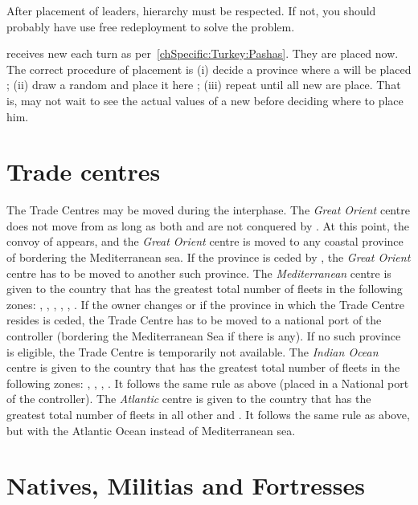 \aparag[Hierarchy]
After placement of leaders, hierarchy must be respected.
\bparag If not, you should probably have use free redeployment to solve the
problem.

\aparag[\Pashas]
\TUR receives new \Pashas each turn as
per~\ref{chSpecific:Turkey:Pashas}. They are placed now.
\bparag The correct procedure of placement is (i) decide a province where a
\Pasha will be placed ; (ii) draw a random \Pasha and place it here ; (iii)
repeat until all new \Pashas are place.
\bparag That is, \TUR may not wait to see the actual values of a new \Pasha
before deciding where to place him.

\section{Trade centres}\label{chInter:Trade Centres}

\aparag The Trade Centres may be moved during the interphase.
\aparag The \emph{Great Orient} centre does not move from 
as long as both  and  are not conquered by \TUR.
\bparag At this point, the convoy of  appears, and the
\emph{Great Orient} centre is moved to any coastal province of
 bordering the Mediterranean sea.
\bparag If the province is ceded by \TUR, the \emph{Great Orient} centre has
to be moved to another such province.
\aparag The \emph{Mediterranean} centre is given to the country that has the
greatest total number of fleets in the following zones: ,
, , , , .
\bparag If the owner changes or if the province in which the Trade Centre
resides is ceded, the Trade Centre has to be moved to a national port of the
controller (bordering the Mediterranean Sea if there is any).
\bparag If no such province is eligible, the Trade Centre is temporarily not
available.
\aparag The \emph{Indian Ocean} centre is given to the country that has the
greatest total number of fleets in the following zones: ,
, , .
\bparag It follows the same rule as above (placed in a National port of the
controller).
\aparag The \emph{Atlantic} centre is given to the country that has the
greatest total number of fleets in all other \STZ and \CTZ.
\bparag It follows the same rule as above, but with the Atlantic Ocean instead
of Mediterranean sea.


\section{Natives, Militias and Fortresses}
\label{chInter:Natives, Militias, Fortresses}


